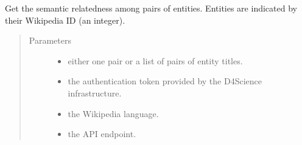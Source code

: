 \documentclass[letterpaper,10pt,english]{sphinxmanual}
\begin{document}
\begin{fulllineitems}
\label{\detokenize{code_comment/tweet_processor:hate_tweet_map.tweets_processor.MyTagMe.relatedness_title}}
\sphinxAtStartPar
Get the semantic relatedness among pairs of entities. Entities are indicated by their
Wikipedia ID (an integer).
\begin{quote}\begin{description}
\item[{Parameters}] \leavevmode\begin{itemize}
\item {} 
\sphinxAtStartPar
{} \textendash{} either one pair or a list of pairs of entity titles.

\item {} 
\sphinxAtStartPar
{} \textendash{} the authentication token provided by the D4Science infrastructure.

\item {} 
\sphinxAtStartPar
{} \textendash{} the Wikipedia language.

\item {} 
\sphinxAtStartPar
{} \textendash{} the API endpoint.

\end{itemize}

\end{description}\end{quote}

\end{fulllineitems}

\end{document}
